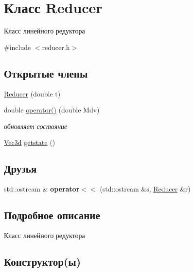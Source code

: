 \hypertarget{classReducer}{}\section{Класс Reducer}
\label{classReducer}


Класс линейного редуктора  




{\ttfamily \#include $<$reducer.\+h$>$}

\subsection*{Открытые члены}
\begin{DoxyCompactItemize}
\item 
\hyperlink{classReducer_aef34e959e4ee8b88409b550245caf460}{Reducer} (double t)
\item 
double \hyperlink{classReducer_a2ba34bd1a838b483352560f568251a17}{operator()} (double Mdv)
\begin{DoxyCompactList}\small\item\em обновляет состояние \end{DoxyCompactList}\item 
\hyperlink{structVec3}{Vec3d} \hyperlink{classReducer_a758fff1ae35351c70fdbefec4b796105}{getstate} ()
\end{DoxyCompactItemize}
\subsection*{Друзья}
\begin{DoxyCompactItemize}
\item 
\mbox{\label{classReducer_ad45359cd93ad74e5957c630e8d559bda}} 
std\+::ostream \& {\bfseries operator$<$$<$} (std\+::ostream \&s, \hyperlink{classReducer}{Reducer} \&r)
\end{DoxyCompactItemize}


\subsection{Подробное описание}
Класс линейного редуктора 

\subsection{Конструктор(ы)}
\mbox{\label{classReducer_aef34e959e4ee8b88409b550245caf460}} 
